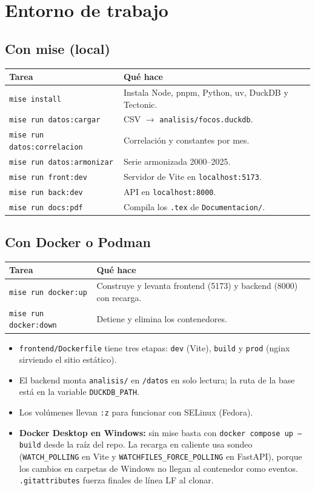 \documentclass[11pt,a4paper]{article}
\begin{document}
\section{Entorno de trabajo}

\subsection*{Con mise (local)}
\begin{tabularx}{\linewidth}{@{}lX@{}}
\toprule
Tarea & Qué hace \\
\midrule
\texttt{mise install} & Instala Node, pnpm, Python, uv, DuckDB y Tectonic. \\
\texttt{mise run datos:cargar} & CSV $\to$ \texttt{analisis/focos.duckdb}. \\
\texttt{mise run datos:correlacion} & Correlación y constantes por mes. \\
\texttt{mise run datos:armonizar} & Serie armonizada 2000--2025. \\
\texttt{mise run front:dev} & Servidor de Vite en \texttt{localhost:5173}. \\
\texttt{mise run back:dev} & API en \texttt{localhost:8000}. \\
\texttt{mise run docs:pdf} & Compila los \texttt{.tex} de \texttt{Documentacion/}. \\
\bottomrule
\end{tabularx}

\subsection*{Con Docker o Podman}
\begin{tabularx}{\linewidth}{@{}lX@{}}
\toprule
Tarea & Qué hace \\
\midrule
\texttt{mise run docker:up} & Construye y levanta frontend (5173) y backend (8000) con recarga. \\
\texttt{mise run docker:down} & Detiene y elimina los contenedores. \\
\bottomrule
\end{tabularx}

\begin{itemize}
  \item \texttt{frontend/Dockerfile} tiene tres etapas: \texttt{dev} (Vite), \texttt{build}
        y \texttt{prod} (nginx sirviendo el sitio estático).
  \item El backend monta \texttt{analisis/} en \texttt{/datos} en solo lectura; la ruta de la
        base está en la variable \texttt{DUCKDB\_PATH}.
  \item Los volúmenes llevan \texttt{:z} para funcionar con SELinux (Fedora).
  \item \textbf{Docker Desktop en Windows:} sin mise basta con
        \texttt{docker compose up --build} desde la raíz del repo. La recarga en caliente
        usa sondeo (\texttt{WATCH\_POLLING} en Vite y \texttt{WATCHFILES\_\allowbreak FORCE\_\allowbreak POLLING} en
        FastAPI), porque los cambios en carpetas de Windows no llegan al contenedor como
        eventos. \texttt{.gitattributes} fuerza finales de línea LF al clonar.
\end{itemize}
\end{document}

